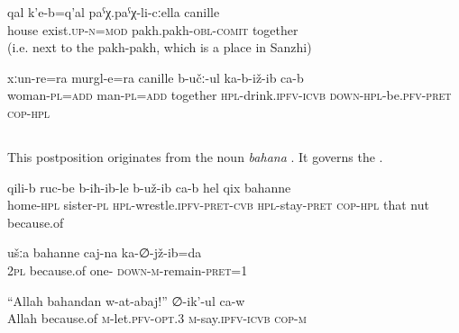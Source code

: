 \begin{exe}
	\ex	\label{ex:There is a house together with the pakh-pakh}
	\gll	qal	k'e-b=q'al	paˁχ.paˁχ-li-cːella	canille  \\
		house	exist.\textsc{up}-\textsc{n}=\textsc{mod}	pakh.pakh-\textsc{obl}-\textsc{comit}	together\\
	\glt	{} (i.e. next to the pakh-pakh, which is a place in Sanzhi)

	\ex	\label{ex:Men and women are sitting together and drinking}
	\gll	xːun-re=ra	murgl-e=ra	canille	b-učː-ul	ka-b-iž-ib	ca-b  \\
		woman-\textsc{pl}=\textsc{add}	man-\textsc{pl}=\textsc{add}	together	\textsc{hpl}-drink.\textsc{ipfv}-\textsc{icvb}	\textsc{down-hpl}-be.\textsc{pfv}-\textsc{pret}	\textsc{cop-hpl}\\
	\glt	{}
\end{exe}



\subsection{ }
\label{ssec:postposition bahanne}

This postposition originates from the noun \textit{bahana} . It governs the .

\begin{exe}
	\ex
	\begin{xlist}
		\ex	\label{At home the sisters were apparently arguing because of the nut}
		\gll	qili-b	ruc-be	b-iħ-ib-le	b-už-ib ca-b	hel	qix	bahanne  \\
			home-\textsc{hpl}	sister-\textsc{pl}	\textsc{hpl}-wrestle.\textsc{ipfv}-\textsc{pret}-\textsc{cvb}	\textsc{hpl}-stay-\textsc{pret} \textsc{cop-hpl}	that	nut	because.of\\
		\glt	{}

		\ex	\label{Because of you I sat in prison once}
		\gll	ušːa	bahanne	caj-na	ka-∅-jž-ib=da  \\
			2\textsc{pl}	because.of	one-	\textsc{down-m}-remain-\textsc{pret}=1\\
		\glt	{}

		\ex	\label{For God’s sake, let me, he says}
		\gll	``Allah	bahandan	w-at-abaj!''	∅-ik'-ul	ca-w  \\
			Allah	because.of	\textsc{m}-let.\textsc{pfv}-\textsc{opt}.3	\textsc{m}-say.\textsc{ipfv}-\textsc{icvb}	\textsc{cop-m}\\
		\glt	{}
	\end{xlist}
\end{exe}


